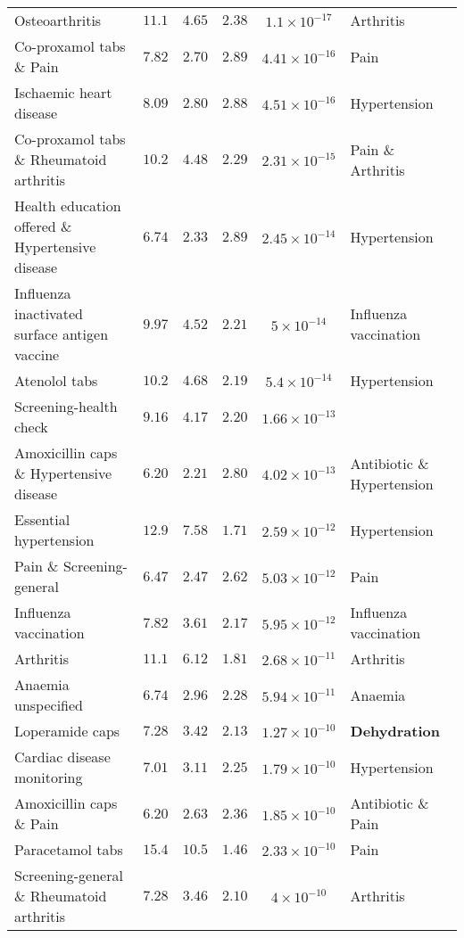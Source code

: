 \documentclass{llncs}
\begin{document}
\begin{longtable}{>{\raggedright}p{2.8cm}ccccp{2.3cm}}
Osteoarthritis & $11.1 $ & $4.65$ & $2.38$ & $1.1 \times 10^{-17}$ & Arthritis \\
Co-proxamol tabs \& Pain & $7.82$ & $2.70 $ & $2.89$ & $4.41 \times 10^{-16}$ & Pain \\
Ischaemic heart disease & $8.09$ & $2.80 $ & $2.88$ & $4.51 \times 10^{-16}$ & Hypertension \\
Co-proxamol tabs \& Rheumatoid arthritis & $10.2$ & $4.48$ & $2.29$ & $2.31 \times 10^{-15}$ & Pain \& Arthritis \\
Health education offered \& Hypertensive disease & $6.74$ & $2.33 $ & $2.89$ & $2.45 \times 10^{-14}$ & Hypertension \\
Influenza inactivated surface antigen vaccine & $9.97$ & $4.52 $ & $2.21$ & $5 \times 10^{-14}$ & Influenza vaccination \\
Atenolol tabs & $10.2 $ & $4.68 $ & $2.19$ & $5.4 \times 10^{-14}$ & Hypertension \\
Screening-health check & $9.16 $ & $4.17 $ & $2.20$ & $1.66 \times 10^{-13}$ & \\
Amoxicillin caps \& Hypertensive disease & $6.20 $ & $2.21 $ & $2.80$ & $4.02 \times 10^{-13}$ & Antibiotic \& Hypertension \\
Essential hypertension & $12.9 $ & $7.58 $ & $1.71$ & $2.59 \times 10^{-12}$ & Hypertension \\
Pain \& Screening-general & $6.47$ & $2.47$ & $2.62$ & $5.03 \times 10^{-12}$ & Pain \\
Influenza vaccination & $7.82 $ & $3.61$ & $2.17$ & $5.95 \times 10^{-12}$ & Influenza vaccination \\
Arthritis & $11.1$ & $6.12 $ & $1.81$ & $2.68 \times 10^{-11}$ & Arthritis \\
Anaemia unspecified & $6.74 $ & $2.96 $ & $2.28$ & $5.94 \times 10^{-11}$ & Anaemia \\
Loperamide caps & $7.28 $ & $3.42$ & $2.13$ & $1.27 \times 10^{-10}$ & \textbf{Dehydration} \cite{de20055} \\
Cardiac disease monitoring & $7.01 $ & $3.11 $ & $2.25$ & $1.79 \times 10^{-10}$ & Hypertension \\
Amoxicillin caps \& Pain & $6.20$ & $2.63 $ & $2.36$ & $1.85 \times 10^{-10}$ & Antibiotic \& Pain \\
Paracetamol tabs& $15.4 $ & $10.5 $ & $1.46$ & $2.33 \times 10^{-10}$ & Pain \\
Screening-general \& Rheumatoid arthritis & $7.28$ & $3.46 $ & $2.10$ & $4 \times 10^{-10}$ & Arthritis \\
\end{longtable}
\end{document}
